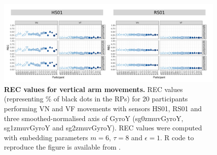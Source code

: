 \begin{figure}[!h]
\centering
\includegraphics[width=1.0\textwidth]{rec_aV}
    \caption{
	{\bf REC values for vertical arm movements.}	
	REC values (representing \% of black dots in the RPs) for 
	20 participants performing VN and VF movements
	with sensors HS01, RS01 and three smoothed-normalised axis 
	of GyroY (sg0zmuvGyroY, sg1zmuvGyroY and sg2zmuvGyroY).
	REC values were computed with 
	embedding parameters $m=6$, $\tau=8$ and $\epsilon=1$.
	R code to reproduce the figure is available from \cite{hwum2018}.
        }
    \label{fig:rec_aV}
\end{figure}


